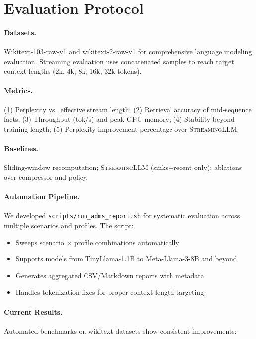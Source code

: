 \documentclass[11pt]{article}
\newcommand{\streaming}{\textsc{StreamingLLM}}
\begin{document}
\section{Evaluation Protocol}

\paragraph{Datasets.}
Wikitext-103-raw-v1 and wikitext-2-raw-v1 for comprehensive language modeling evaluation. Streaming evaluation uses concatenated samples to reach target context lengths (2k, 4k, 8k, 16k, 32k tokens).

\paragraph{Metrics.}
(1) Perplexity vs.\ effective stream length; (2) Retrieval accuracy of mid-sequence facts; (3) Throughput (tok/s) and peak GPU memory; (4) Stability beyond training length; (5) Perplexity improvement percentage over \streaming{}.

\paragraph{Baselines.}
Sliding-window recomputation; \streaming{} (sinks+recent only); ablations over compressor and policy.

\paragraph{Automation Pipeline.}
We developed \texttt{scripts/run\_adms\_report.sh} for systematic evaluation across multiple scenarios and profiles. The script:
\begin{itemize}
  \item Sweeps scenario $\times$ profile combinations automatically
  \item Supports models from TinyLlama-1.1B to Meta-Llama-3-8B and beyond
  \item Generates aggregated CSV/Markdown reports with metadata
  \item Handles tokenization fixes for proper context length targeting
\end{itemize}

\paragraph{Current Results.}
Automated benchmarks on wikitext datasets show consistent improvements:
\end{document}
